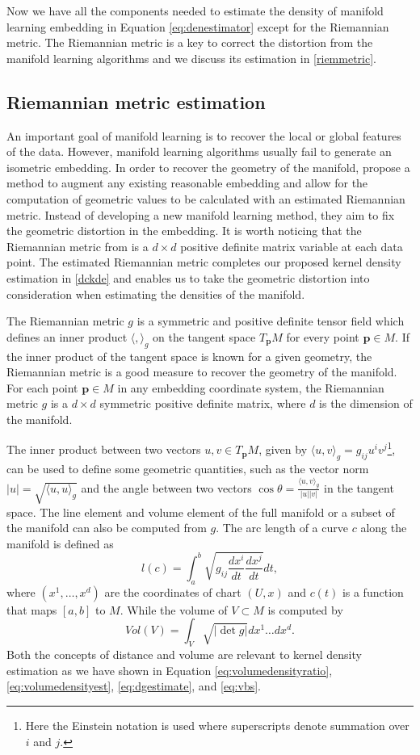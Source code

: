 \documentclass[11pt,a4paper,]{article}
\begin{document}
Now we have all the components needed to estimate the density of manifold learning embedding in Equation \eqref{eq:denestimator} except for the Riemannian metric. The Riemannian metric is a key to correct the distortion from the manifold learning algorithms and we discuss its estimation in \autoref{riemmetric}.

\hypertarget{riemmetric}{%
\subsection{Riemannian metric estimation}\label{riemmetric}}

An important goal of manifold learning is to recover the local or global features of the data. However, manifold learning algorithms usually fail to generate an isometric embedding.
In order to recover the geometry of the manifold, \textcite{Perrault-Joncas2013-pq} propose a method to augment any existing reasonable embedding and allow for the computation of geometric values to be calculated with an estimated Riemannian metric. Instead of developing a new manifold learning method, they aim to fix the geometric distortion in the embedding. It is worth noticing that the Riemannian metric from \textcite{Perrault-Joncas2013-pq} is a \(d\times d\) positive definite matrix variable at each data point. The estimated Riemannian metric completes our proposed kernel density estimation in \autoref{dckde} and enables us to take the geometric distortion into consideration when estimating the densities of the manifold.

The Riemannian metric \(g\) is a symmetric and positive definite tensor field which defines an inner product \(\langle,\rangle_g\) on the tangent space \(T_{\pmb{p}} M\) for every point \(\pmb{p} \in M\). If the inner product of the tangent space is known for a given geometry, the Riemannian metric is a good measure to recover the geometry of the manifold. For each point \(\pmb{p} \in M\) in any embedding coordinate system, the Riemannian metric \(g\) is a \(d\times d\) symmetric positive definite matrix, where \(d\) is the dimension of the manifold.

The inner product between two vectors \(u,v \in T_{\pmb{p}}M\), given by \(\langle u,v \rangle_g=g_{ij}u^iv^j\)\footnote{Here the Einstein notation is used where superscripts denote summation over \(i\) and \(j\).}, can be used to define some geometric quantities, such as the vector norm \(|u|=\sqrt{\langle u,u \rangle_g}\) and the angle between two vectors \(\cos{\theta}=\frac{\langle u,v \rangle_g}{|u| |v|}\) in the tangent space.
The line element and volume element of the full manifold or a subset of the manifold can also be computed from \(g\). The arc length of a curve \(c\) along the manifold is defined as
\[
l(c)=\int_a^b \sqrt{g_{ij} \frac{dx^i}{dt} \frac{dx^j}{dt}} dt,
\]
where \((x^1,\dots,x^d)\) are the coordinates of chart \((U,x)\) and \(c(t)\) is a function that maps \([a,b]\) to \(M\). While the volume of \(V\subset M\) is computed by
\[
Vol(V)=\int_V \sqrt{|\det g|} dx^1\dots dx^d.
\]
Both the concepts of distance and volume are relevant to kernel density estimation as we have shown in Equation \eqref{eq:volumedensityratio}, \eqref{eq:volumedensityest}, \eqref{eq:dgestimate}, and \eqref{eq:vbs}.
\end{document}
